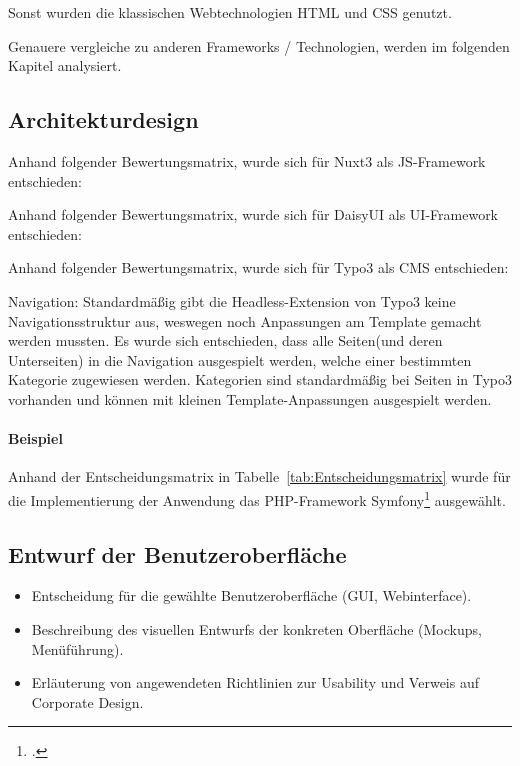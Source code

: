 Sonst wurden die klassischen Webtechnologien HTML und CSS genutzt.

Genauere vergleiche zu anderen Frameworks / Technologien, werden im folgenden Kapitel analysiert.

\subsection{Architekturdesign}
\label{sec:Architekturdesign}

Anhand folgender Bewertungsmatrix, wurde sich für Nuxt3 als JS-Framework entschieden:

Anhand folgender Bewertungsmatrix, wurde sich für DaisyUI als UI-Framework entschieden:

Anhand folgender Bewertungsmatrix, wurde sich für Typo3 als CMS entschieden:

Navigation: Standardmäßig gibt die Headless-Extension von Typo3 keine Navigationsstruktur aus, weswegen noch Anpassungen am Template gemacht werden mussten. Es wurde sich entschieden, dass alle Seiten(und deren Unterseiten) in die Navigation ausgespielt werden, welche einer bestimmten Kategorie zugewiesen werden. Kategorien sind standardmäßig bei Seiten in Typo3 vorhanden und können mit kleinen Template-Anpassungen ausgespielt werden.

\paragraph{Beispiel}
Anhand der Entscheidungsmatrix in Tabelle~\ref{tab:Entscheidungsmatrix} wurde für die Implementierung der Anwendung das \acs{PHP}-Framework Symfony\footnote{\Vgl \citet{Symfony}.} ausgewählt. 



\subsection{Entwurf der Benutzeroberfläche}
\label{sec:Benutzeroberflaeche} 
\begin{itemize}
	\item Entscheidung für die gewählte Benutzeroberfläche (\zB GUI, Webinterface).
	\item Beschreibung des visuellen Entwurfs der konkreten Oberfläche (\zB Mockups, Menüführung).
	\item \Ggfs Erläuterung von angewendeten Richtlinien zur Usability und Verweis auf Corporate Design.
\end{itemize}

